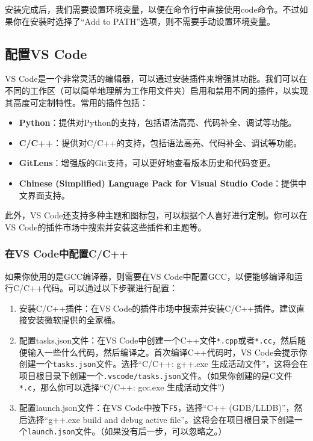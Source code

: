\documentclass[../main.tex]{subfiles}
\begin{document}
安装完成后，我们需要设置环境变量，以便在命令行中直接使用code命令。不过如果你在安装时选择了“Add to PATH”选项，则不需要手动设置环境变量。

\subsection{配置VS Code}

VS Code是一个非常灵活的编辑器，可以通过安装插件来增强其功能。我们可以在不同的工作区（可以简单地理解为工作用文件夹）启用和禁用不同的插件，以实现其高度可定制特性。常用的插件包括：

\begin{itemize}
  \item \textbf{Python}：提供对Python的支持，包括语法高亮、代码补全、调试等功能。
  \item \textbf{C/C++}：提供对C/C++的支持，包括语法高亮、代码补全、调试等功能。
  \item \textbf{GitLens}：增强版的Git支持，可以更好地查看版本历史和代码变更。
  \item \textbf{Chinese (Simplified) Language Pack for Visual Studio Code}：提供中文界面支持。
\end{itemize}

此外，VS Code还支持多种主题和图标包，可以根据个人喜好进行定制。你可以在VS Code的插件市场中搜索并安装这些插件和主题等。

\subsubsection{在VS Code中配置C/C++}\label{sec:configure-cpp}

如果你使用的是GCC编译器，则需要在VS Code中配置GCC，以便能够编译和运行C/C++代码。可以通过以下步骤进行配置：

\begin{enumerate}
  \item 安装C/C++插件：在VS Code的插件市场中搜索并安装C/C++插件。建议直接安装微软提供的全家桶。
  \item 配置tasks.json文件：在VS Code中创建一个C++文件\texttt{*.cpp}或者\texttt{*.cc}，然后随便输入一些什么代码，然后编译之。首次编译C++代码时，VS Code会提示你创建一个\texttt{tasks.json}文件。选择“C/C++: g++.exe 生成活动文件”，这将会在项目根目录下创建一个\texttt{.vscode/tasks.json}文件。（如果你创建的是C文件\texttt{*.c}，那么你可以选择“C/C++: gcc.exe 生成活动文件”）
  \item 配置launch.json文件：在VS Code中按下\texttt{F5}，选择“C++ (GDB/LLDB)”，然后选择“g++.exe build and debug active file”。这将会在项目根目录下创建一个\texttt{launch.json}文件。（如果没有后一步，可以忽略之。）
\end{enumerate}
\end{document}
